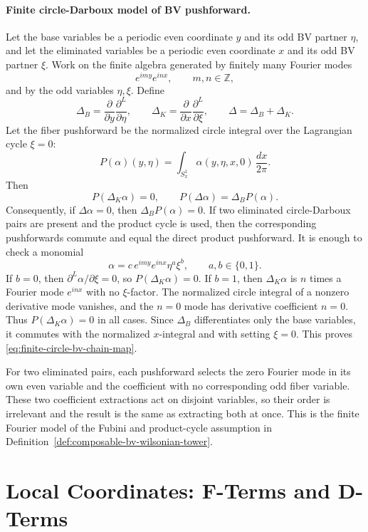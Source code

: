 \paragraph{Finite circle-Darboux model of BV pushforward.}
Let the base variables be a periodic even coordinate \(y\) and its odd BV
partner \(\eta\), and let the eliminated variables be a periodic even
coordinate \(x\) and its odd BV partner \(\xi\).  Work on the finite algebra
generated by finitely many Fourier modes
\[
  e^{imy}e^{inx},\qquad m,n\in\mathbb Z,
\]
and by the odd variables \(\eta,\xi\).  Define
\[
  \Delta_B=\frac{\partial}{\partial y}\frac{\partial^L}{\partial\eta},
  \qquad
  \Delta_K=\frac{\partial}{\partial x}\frac{\partial^L}{\partial\xi},
  \qquad
  \Delta=\Delta_B+\Delta_K .
\]
Let the fiber pushforward be the normalized circle integral over the
Lagrangian cycle \(\xi=0\):
\[
  P(\alpha)(y,\eta)
  =
  \int_{S^1_x}\alpha(y,\eta,x,0)\,\frac{dx}{2\pi}.
\]
Then
\begin{equation}
  P(\Delta_K\alpha)=0,\qquad
  P(\Delta\alpha)=\Delta_B P(\alpha).
  \label{eq:finite-circle-bv-chain-map}
\end{equation}
Consequently, if \(\Delta\alpha=0\), then \(\Delta_B P(\alpha)=0\).  If two
eliminated circle-Darboux pairs are present and the product cycle is used,
then the corresponding pushforwards commute and equal the direct product
pushforward.
It is enough to check a monomial
\[
  \alpha
  =
  c\,e^{imy}e^{inx}\eta^a\xi^b,
  \qquad a,b\in\{0,1\}.
\]
If \(b=0\), then \(\partial^L\alpha/\partial\xi=0\), so
\(P(\Delta_K\alpha)=0\).  If \(b=1\), then
\(\Delta_K\alpha\) is \(n\) times a Fourier mode \(e^{inx}\) with no
\(\xi\)-factor.  The normalized circle integral of a nonzero derivative mode
vanishes, and the \(n=0\) mode has derivative coefficient \(n=0\).  Thus
\(P(\Delta_K\alpha)=0\) in all cases.  Since \(\Delta_B\) differentiates
only the base variables, it commutes with the normalized \(x\)-integral and
with setting \(\xi=0\).  This proves
\eqref{eq:finite-circle-bv-chain-map}.

For two eliminated pairs, each pushforward selects the zero Fourier mode in
its own even variable and the coefficient with no corresponding odd fiber
variable.  These two coefficient extractions act on disjoint variables, so
their order is irrelevant and the result is the same as extracting both at
once.  This is the finite Fourier model of the Fubini and product-cycle
assumption in Definition~\ref{def:composable-bv-wilsonian-tower}.

\section{Local Coordinates: F-Terms and D-Terms}


